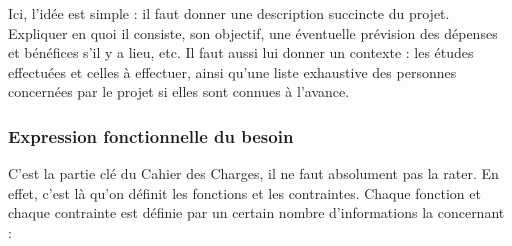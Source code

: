 Ici, l'idée est simple : il faut donner une description succincte du projet. Expliquer en quoi il consiste, son objectif, une éventuelle prévision des dépenses et bénéfices s'il y a lieu, etc.
Il faut aussi lui donner un contexte : les études effectuées et celles à effectuer, ainsi qu'une liste exhaustive des personnes concernées par le projet si elles sont connues à l'avance.

\subsubsection{Expression fonctionnelle du besoin}

C'est la partie clé du Cahier des Charges, il ne faut absolument pas la rater. En effet, c'est là qu'on définit les fonctions et les contraintes.
Chaque fonction et chaque contrainte est définie par un certain nombre d'informations la concernant :\\

